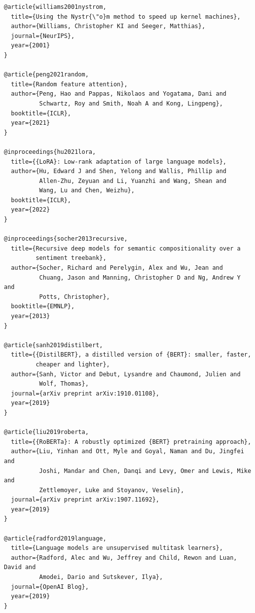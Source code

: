 \begin{lstlisting}
@article{williams2001nystrom,
  title={Using the Nystr{\"o}m method to speed up kernel machines},
  author={Williams, Christopher KI and Seeger, Matthias},
  journal={NeurIPS},
  year={2001}
}

@article{peng2021random,
  title={Random feature attention},
  author={Peng, Hao and Pappas, Nikolaos and Yogatama, Dani and 
          Schwartz, Roy and Smith, Noah A and Kong, Lingpeng},
  booktitle={ICLR},
  year={2021}
}

@inproceedings{hu2021lora,
  title={{LoRA}: Low-rank adaptation of large language models},
  author={Hu, Edward J and Shen, Yelong and Wallis, Phillip and 
          Allen-Zhu, Zeyuan and Li, Yuanzhi and Wang, Shean and 
          Wang, Lu and Chen, Weizhu},
  booktitle={ICLR},
  year={2022}
}

@inproceedings{socher2013recursive,
  title={Recursive deep models for semantic compositionality over a 
         sentiment treebank},
  author={Socher, Richard and Perelygin, Alex and Wu, Jean and 
          Chuang, Jason and Manning, Christopher D and Ng, Andrew Y and 
          Potts, Christopher},
  booktitle={EMNLP},
  year={2013}
}

@article{sanh2019distilbert,
  title={{DistilBERT}, a distilled version of {BERT}: smaller, faster, 
         cheaper and lighter},
  author={Sanh, Victor and Debut, Lysandre and Chaumond, Julien and 
          Wolf, Thomas},
  journal={arXiv preprint arXiv:1910.01108},
  year={2019}
}

@article{liu2019roberta,
  title={{RoBERTa}: A robustly optimized {BERT} pretraining approach},
  author={Liu, Yinhan and Ott, Myle and Goyal, Naman and Du, Jingfei and 
          Joshi, Mandar and Chen, Danqi and Levy, Omer and Lewis, Mike and 
          Zettlemoyer, Luke and Stoyanov, Veselin},
  journal={arXiv preprint arXiv:1907.11692},
  year={2019}
}

@article{radford2019language,
  title={Language models are unsupervised multitask learners},
  author={Radford, Alec and Wu, Jeffrey and Child, Rewon and Luan, David and 
          Amodei, Dario and Sutskever, Ilya},
  journal={OpenAI Blog},
  year={2019}
}
\end{lstlisting}

